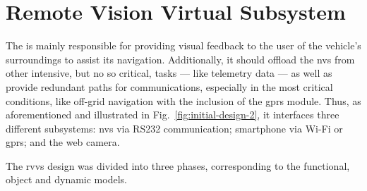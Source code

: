 \section{Remote Vision Virtual Subsystem}%
\label{sec:remote-visi-subsyst-design}
The  is mainly responsible for providing visual feedback to the
user of the vehicle's surroundings to assist its navigation. Additionally, it should offload the
\gls{nvs} from other intensive, but no so critical, tasks --- like
telemetry data --- as well as provide redundant paths for communications,
especially in the most critical conditions, like off-grid navigation with the
inclusion of the \gls{gprs} module. Thus, as aforementioned and illustrated in
Fig.~\ref{fig:initial-design-2}, it interfaces three different subsystems:
\gls{nvs} via RS232 communication; smartphone via Wi-Fi or \gls{gprs}; and the
web camera.

The \acrshort{rvvs} design was divided into three phases, corresponding to the
functional, object and dynamic models.
%
